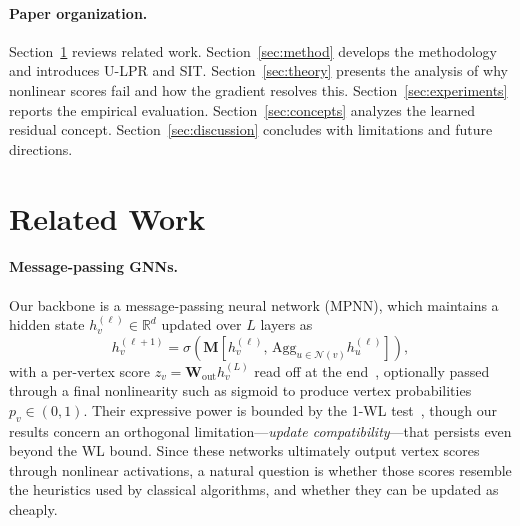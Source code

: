 \documentclass[11pt]{article}
\theoremstyle{plain}
\theoremstyle{remark}
\theoremstyle{plain}
\begin{document}



\paragraph{Paper organization.}
Section~\ref{sec:related} reviews related work. Section~\ref{sec:method} develops
the methodology and introduces U-LPR and SIT. Section~\ref{sec:theory} presents
the analysis of why nonlinear scores fail and how the gradient resolves this.
Section~\ref{sec:experiments} reports the empirical evaluation.
Section~\ref{sec:concepts} analyzes the learned residual concept.
Section~\ref{sec:discussion} concludes with limitations and future directions.

\section{Related Work}
\label{sec:related}


\paragraph{Message-passing GNNs.}
Our backbone is a message-passing neural network (MPNN), which maintains a hidden
state $h_v^{(\ell)} \in \mathbb{R}^d$ updated over $L$ layers as
\[
  h_v^{(\ell+1)}
  =
  \sigma\!\left(
    \mathbf{M}\!\left[
      h_v^{(\ell)},\,
      \mathrm{Agg}_{u\in\mathcal{N}(v)} h_u^{(\ell)}
    \right]
  \right),
\]
with a per-vertex score $z_v = \mathbf{W}_{\mathrm{out}} h_v^{(L)}$ read off at the
end~\citep{xu2019}, optionally passed through a final nonlinearity such as sigmoid
to produce vertex probabilities $p_v \in (0,1)$. Their expressive power is bounded
by the 1-WL test~\citep{xu2019, morris2019}, though our results concern an
orthogonal limitation---\emph{update compatibility}---that persists even beyond the
WL bound. Since these networks ultimately output vertex scores through nonlinear
activations, a natural question is whether those scores resemble the heuristics used
by classical algorithms, and whether they can be updated as cheaply.
\end{document}
